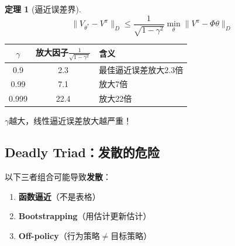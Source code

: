 \documentclass[11pt,a4paper]{article}
\theoremstyle{definition}
\newtheorem{theorem}{定理}[section]
\begin{document}
\begin{theorem}[逼近误差界]
\[
\|V_{\theta^*} - V^\pi\|_D \leq \frac{1}{\sqrt{1-\gamma^2}} \min_\theta \|V^\pi - \Phi\theta\|_D
\]
\end{theorem}

\begin{calculation}[误差放大]
\begin{center}
\begin{tabular}{c|c|l}
\toprule
$\gamma$ & 放大因子$\frac{1}{\sqrt{1-\gamma^2}}$ & 含义 \\
\midrule
0.9 & 2.3 & 最佳逼近误差放大2.3倍 \\
0.99 & 7.1 & 放大7倍 \\
0.999 & 22.4 & 放大22倍 \\
\bottomrule
\end{tabular}
\end{center}

$\gamma$越大，线性逼近误差放大越严重！
\end{calculation}

\subsection{Deadly Triad：发散的危险}

\begin{keypoint}[致命三角]
以下三者组合可能导致\textbf{发散}：
\begin{enumerate}
    \item \textbf{函数逼近}（不是表格）
    \item \textbf{Bootstrapping}（用估计更新估计）
    \item \textbf{Off-policy}（行为策略$\neq$目标策略）
\end{enumerate}
\end{keypoint}
\end{document}
